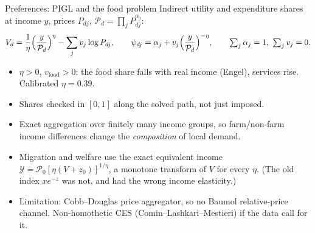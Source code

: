 \documentclass[10pt,aspectratio=169]{beamer}
\newcommand{\hl}[1]{\textcolor{mOrange}{#1}}
\begin{document}
\begin{frame}{Preferences: PIGL and the food problem}
  Indirect utility and expenditure shares at income $y$, prices $P_{dj}$,
  $\mathcal P_d=\prod_jP_{dj}^{\alpha_j}$:
  \begin{equation*}
    V_d=\frac1\eta\Bigl(\frac{y}{\mathcal P_d}\Bigr)^{\eta}-\sum_j v_j\log P_{dj},
    \qquad
    \psi_{dj}=\alpha_j+v_j\Bigl(\frac{y}{\mathcal P_d}\Bigr)^{-\eta},
    \qquad \textstyle\sum_j\alpha_j=1,\ \sum_jv_j=0.
  \end{equation*}
  \small
  \begin{itemize}
    \item $\eta>0$, $v_{\text{food}}>0$: the food share falls with real income (Engel),
          services rise. Calibrated $\eta=0.39$.
    \item Shares checked in $[0,1]$ along the solved path, not just imposed.
    \item Exact aggregation over finitely many income groups, so farm/non-farm income
          differences change the \emph{composition} of local demand.
    \item Migration and welfare use the \hl{exact equivalent income}
          $\mathcal Y=\mathcal P_0[\eta(V+z_0)]^{1/\eta}$, a monotone transform of $V$
          for every $\eta$. (The old index $x e^{-z}$ was not, and had the wrong income
          elasticity.)
    \item Limitation: Cobb--Douglas price aggregator, so no Baumol relative-price channel.
          Non-homothetic CES (Comin--Lashkari--Mestieri) if the data call for it.
  \end{itemize}
\end{frame}
\end{document}
